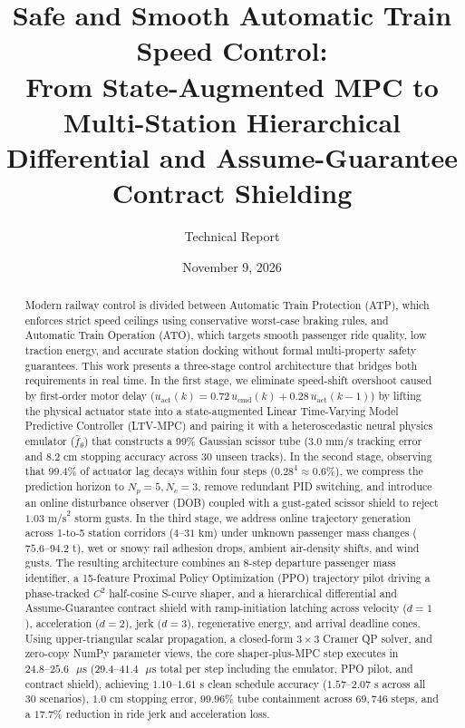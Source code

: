 \documentclass[10pt,a4paper]{article}
\title{Safe and Smooth Automatic Train Speed Control:\\
From State-Augmented MPC to Multi-Station Hierarchical\\
Differential and Assume-Guarantee Contract Shielding}
\author{Technical Report}
\date{November 9, 2026}
\begin{document}
\maketitle

\begin{abstract}
Modern railway control is divided between Automatic Train Protection (ATP), which enforces strict speed ceilings using conservative worst-case braking rules, and Automatic Train Operation (ATO), which targets smooth passenger ride quality, low traction energy, and accurate station docking without formal multi-property safety guarantees. This work presents a three-stage control architecture that bridges both requirements in real time. In the first stage, we eliminate speed-shift overshoot caused by first-order motor delay ($u_{\text{act}}(k) = 0.72\,u_{\text{cmd}}(k) + 0.28\,u_{\text{act}}(k-1)$) by lifting the physical actuator state into a state-augmented Linear Time-Varying Model Predictive Controller (LTV-MPC) and pairing it with a heteroscedastic neural physics emulator ($\hat{f}_\theta$) that constructs a 99\% Gaussian scissor tube ($3.0\text{ mm/s}$ tracking error and $8.2\text{ cm}$ stopping accuracy across 30 unseen tracks). In the second stage, observing that $99.4\%$ of actuator lag decays within four steps ($0.28^4 \approx 0.6\%$), we compress the prediction horizon to $N_p = 5, N_c = 3$, remove redundant PID switching, and introduce an online disturbance observer (DOB) coupled with a gust-gated scissor shield to reject $1.03\text{ m/s}^2$ storm gusts. In the third stage, we address online trajectory generation across 1-to-5 station corridors ($4\text{--}31\text{ km}$) under unknown passenger mass changes ($75.6\text{--}94.2\text{ t}$), wet or snowy rail adhesion drops, ambient air-density shifts, and wind gusts. The resulting architecture combines an 8-step departure passenger mass identifier, a 15-feature Proximal Policy Optimization (PPO) trajectory pilot driving a phase-tracked $C^2$ half-cosine S-curve shaper, and a hierarchical differential and Assume-Guarantee contract shield with ramp-initiation latching across velocity ($d=1$), acceleration ($d=2$), jerk ($d=3$), regenerative energy, and arrival deadline cones. Using upper-triangular scalar propagation, a closed-form $3\times 3$ Cramer QP solver, and zero-copy NumPy parameter views, the core shaper-plus-MPC step executes in $24.8\text{--}25.6\text{ }\mu\text{s}$ ($29.4\text{--}41.4\text{ }\mu\text{s}$ total per step including the emulator, PPO pilot, and contract shield), achieving $1.10\text{--}1.61\text{ s}$ clean schedule accuracy ($1.57\text{--}2.07\text{ s}$ across all 30 scenarios), $1.0\text{ cm}$ stopping error, $99.96\%$ tube containment across $69,746$ steps, and a $17.7\%$ reduction in ride jerk and acceleration loss.
\end{abstract}
\end{document}
